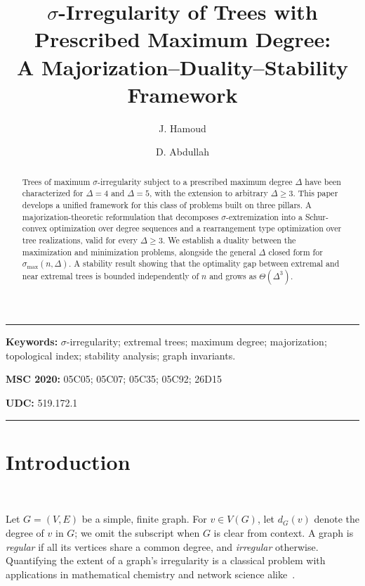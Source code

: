 \documentclass[12pt]{amsart}
\author{J. Hamoud}
\author{D. Abdullah}
\title[$\sigma$-Irregularity of Trees]{$\sigma$-Irregularity of Trees with Prescribed Maximum Degree: \\
A Majorization--Duality--Stability Framework}
\date{}
\begin{document}
\begin{abstract}
Trees of maximum $\sigma$-irregularity subject to a prescribed maximum degree $\Delta$ have been characterized for $\Delta=4$ and $\Delta=5$, with the extension to arbitrary $\Delta\geqslant 3$. This paper develops a unified framework for this class of problems built on three pillars. A majorization-theoretic reformulation that
decomposes $\sigma$-extremization into a Schur-convex optimization  over degree sequences and a rearrangement type optimization over
tree realizations, valid for every $\Delta\geqslant 3$. We
establish a duality between the maximization and minimization problems, alongside the general $\Delta$ closed form for
$\sigma_{\max}(n,\Delta)$. A stability result showing that the optimality gap between extremal and near extremal trees is bounded independently of $n$ and grows as $\Theta(\Delta^3)$. 
\end{abstract}

\maketitle


\noindent\rule{15.9cm}{1.0pt}

\noindent
\textbf{
Keywords:} $\sigma$-irregularity; extremal trees; maximum
degree; majorization; topological index; stability analysis; graph invariants.


\medskip

\noindent
{\bf
MSC 2020:} 05C05; 05C07; 05C35; 05C92; 26D15

\medskip

\noindent
{\bf
UDC:} 519.172.1



\noindent\rule{15.9cm}{1.0pt}

\section{Introduction}~\label{sec01intro}

Let $G=(V,E)$ be a simple, finite graph. For $v\in V(G)$, let $d_G(v)$ denote the degree of $v$ in $G$; we omit the subscript when $G$ is clear from context. 
A graph is \emph{regular} if all its vertices share a common degree, and \emph{irregular} otherwise. 
Quantifying the extent of a graph's irregularity is a classical problem with applications in mathematical chemistry and network
science alike~\cite{CriadoEtAl2014,Estrada2010a,Estrada2010b,RetiEtAl2018}.
\end{document}
